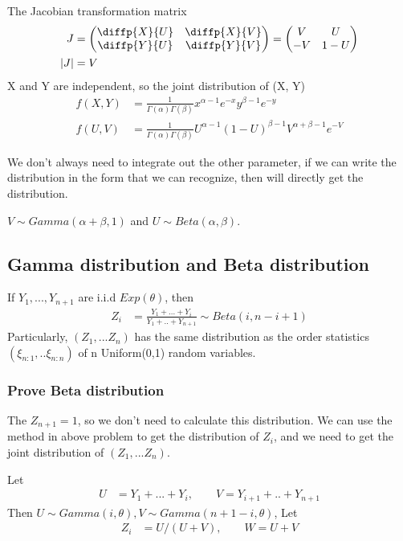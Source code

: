 \documentclass[11pt]{article} %
\begin{document}
\begin{itemize}
The Jacobian transformation matrix
\begin{align*}
	J &= \begin{pmatrix}
		\diffp{X}{U} & \diffp{X}{V} \\
		\diffp{Y}{U} & \diffp{Y}{V} 
	\end{pmatrix} =  \begin{pmatrix}
	V & U \\
	-V & 1-U
\end{pmatrix}\\
|J| &= V
\end{align*}
X and Y are independent, so the joint distribution of (X, Y) 
\begin{align*}
	f(X, Y) &= \frac{1}{\Gamma{(\alpha)} \Gamma{(\beta)}} x^{\alpha -1} e^{-x} y^{\beta -1} e^{-y}\\
	f(U, V) &= \frac{1}{\Gamma{(\alpha)} \Gamma{(\beta)}} U^{\alpha -1} (1-U)^{\beta -1} V^{\alpha + \beta -1} e^{-V}
\end{align*}

We don't always need to integrate out the other parameter, if we can write the distribution in the form that we can recognize, then will directly get the distribution. 

$V \sim Gamma (\alpha + \beta, 1)$ and $U \sim Beta(\alpha, \beta)$.

\end{itemize}



\subsection{Gamma distribution and Beta distribution}
If $Y_1, ..., Y_{n+1}$ are i.i.d $Exp(\theta)$, then 
\begin{align*}
	Z_i &= \frac{Y_1 + ...+ Y_i}{Y_1+ .. + Y_{n+1}} \sim Beta(i, n-i+1) 
\end{align*}
Particularly, $(Z_1, ... Z_n)$ has the same distribution as the order statistics $(\xi_{n:1}, .. \xi_{n:n})$ of n Uniform(0,1) random variables.

\subsubsection{Prove Beta distribution}
The $Z_{n+1} = 1$, so we don't need to calculate this distribution. 
We can use the method in above problem to get the distribution of $Z_i$, and we need to get the joint distribution of $(Z_1, ... Z_n)$.

Let 
\begin{align*}
	U &=Y_1 + ...+ Y_i, \qquad V= Y_{i+1}+ .. + Y_{n+1} 
\end{align*}
Then $U \sim Gamma(i, \theta), V \sim Gamma(n+1-i, \theta)$, Let
\begin{align*}
 	Z_i &= U/(U+V), \qquad W = U+V 
\end{align*}
\end{document}
